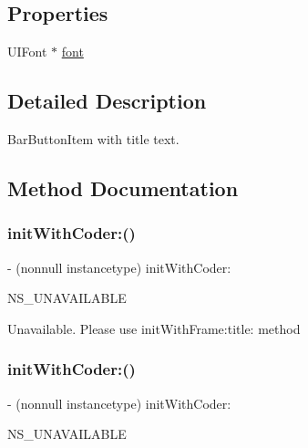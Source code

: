 \subsection*{Properties}
\begin{DoxyCompactItemize}
\item 
U\+I\+Font $\ast$ \mbox{\hyperlink{interface_i_q_title_bar_button_item_ad4fb524377edb9b2f494bf47a8d7c613}{font}}
\end{DoxyCompactItemize}


\subsection{Detailed Description}
Bar\+Button\+Item with title text. 

\subsection{Method Documentation}
\mbox{\label{interface_i_q_title_bar_button_item_a0e7313fb6699ca445b14fd7b840a736f}} 
\subsubsection{\texorpdfstring{init\+With\+Coder\+:()}{initWithCoder:()}\hspace{0.1cm}{\footnotesize\ttfamily [1/3]}}
{\footnotesize\ttfamily -\/ (nonnull instancetype) init\+With\+Coder\+: \begin{DoxyParamCaption}\item[{(nullable N\+S\+Coder $\ast$)}]{N\+S\+\_\+\+U\+N\+A\+V\+A\+I\+L\+A\+B\+LE }\end{DoxyParamCaption}}

Unavailable. Please use init\+With\+Frame\+:title\+: method \mbox{\label{interface_i_q_title_bar_button_item_a0e7313fb6699ca445b14fd7b840a736f}} 
\subsubsection{\texorpdfstring{init\+With\+Coder\+:()}{initWithCoder:()}\hspace{0.1cm}{\footnotesize\ttfamily [2/3]}}
{\footnotesize\ttfamily -\/ (nonnull instancetype) init\+With\+Coder\+: \begin{DoxyParamCaption}\item[{(nullable N\+S\+Coder $\ast$)}]{N\+S\+\_\+\+U\+N\+A\+V\+A\+I\+L\+A\+B\+LE }\end{DoxyParamCaption}}

